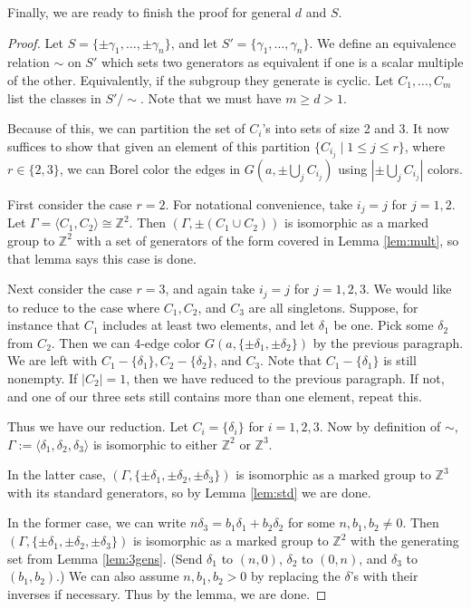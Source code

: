 \documentclass[12pt]{article}
\newcommand{\0}{\varnothing}
\newcommand{\Z}{\mathbb{Z}}
\begin{document}
Finally, we are ready to finish the proof for general $d$ and $S$.

\begin{proof}
Let $S = \{\pm \gamma_1,\ldots,\pm \gamma_n\}$, and let $S' = \{\gamma_1,\ldots,\gamma_n\}$. We define an equivalence relation $\sim$ on $S'$ which sets two generators as equivalent if one is a scalar multiple of the other. Equivalently, if the subgroup they generate is cyclic. Let $C_1,\ldots,C_m$ list the classes in $S'/\sim$. Note that we must have $m \geq d > 1$.

Because of this, we can partition the set of $C_i$'s into sets of size 2 and 3. It now suffices to show that given an element of this partition $\{C_{i_j} \mid 1 \leq j \leq r\}$, where $r \in \{2,3\}$, we can Borel color the edges in $G(a,\pm \bigcup_j C_{i_j})$ using $|\pm \bigcup_j C_{i_j}|$ colors.

First consider the case $r = 2$. For notational convenience, take $i_j = j$ for $j=1,2$. Let $\Gamma = \langle C_1,C_2 \rangle \cong \Z^2$. Then $(\Gamma,\pm (C_1 \cup C_2))$ is isomorphic as a marked group to $\Z^2$ with a set of generators of the form covered in Lemma \ref{lem:mult}, so that lemma says this case is done.

Next consider the case $r=3$, and again take $i_j = j$ for $j=1,2,3$. We would like to reduce to the case where $C_1,C_2$, and $C_3$ are all singletons. Suppose, for instance that $C_1$ includes at least two elements, and let $\delta_1$ be one. Pick some $\delta_2$ from $C_2$. Then we can $4$-edge color $G(a,\{\pm \delta_1,\pm \delta_2\})$ by the previous paragraph. We are left with $C_1 - \{\delta_1\}, C_2 - \{\delta_2\}$, and $C_3$. Note that $C_1 - \{\delta_1\}$ is still nonempty. If $|C_2| = 1$, then we have reduced to the previous paragraph. If not, and one of our three sets still contains more than one element, repeat this.

Thus we have our reduction. Let $C_i = \{\delta_i\}$ for $i=1,2,3$. Now by definition of $\sim$, $\Gamma := \langle \delta_1,\delta_2,\delta_3 \rangle$ is isomorphic to either $\Z^2$ or $\Z^3$. 

In the latter case, $(\Gamma,\{\pm \delta_1,\pm \delta_2, \pm \delta_3\})$ is isomorphic as a marked group to $\Z^3$ with its standard generators, so by Lemma \ref{lem:std} we are done.

In the former case, we can write $n \delta_3 = b_1 \delta_1 + b_2 \delta_2$ for some $n,b_1,b_2 \neq 0$. Then $(\Gamma,\{\pm \delta_1,\pm \delta_2, \pm \delta_3\})$ is isomorphic as a marked group to $\Z^2$ with the generating set from Lemma \ref{lem:3gens}. (Send $\delta_1$ to $(n,0)$, $\delta_2$ to $(0,n)$, and $\delta_3$ to $(b_1,b_2)$.) We can also assume $n,b_1,b_2 > 0$ by replacing the $\delta$'s with their inverses if necessary. Thus by the lemma, we are done.
\end{proof}
\end{document}
